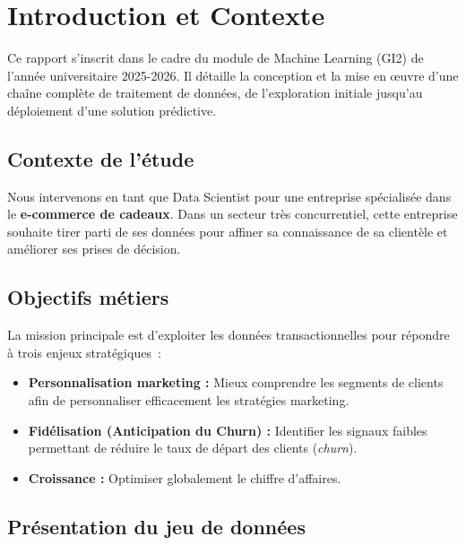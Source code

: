 \documentclass[12pt, a4paper]{article}
\begin{document}
\newpage
\tableofcontents
\newpage

\section{Introduction et Contexte}

Ce rapport s'inscrit dans le cadre du module de Machine Learning (GI2) de l'année
universitaire 2025-2026. Il détaille la conception et la mise en œuvre d'une chaîne
complète de traitement de données, de l'exploration initiale jusqu'au déploiement
d'une solution prédictive.

\subsection{Contexte de l'étude}

Nous intervenons en tant que Data Scientist pour une entreprise spécialisée dans le
\textbf{e-commerce de cadeaux}. Dans un secteur très concurrentiel, cette entreprise
souhaite tirer parti de ses données pour affiner sa connaissance de sa clientèle et
améliorer ses prises de décision.

\subsection{Objectifs métiers}

La mission principale est d'exploiter les données transactionnelles pour répondre
à trois enjeux stratégiques~:

\begin{itemize}
  \item \textbf{Personnalisation marketing :} Mieux comprendre les segments
        de clients afin de personnaliser efficacement les stratégies marketing.
  \item \textbf{Fidélisation (Anticipation du Churn) :} Identifier les signaux
        faibles permettant de réduire le taux de départ des clients (\textit{churn}).
  \item \textbf{Croissance :} Optimiser globalement le chiffre d'affaires.
\end{itemize}

\subsection{Présentation du jeu de données}
\end{document}
